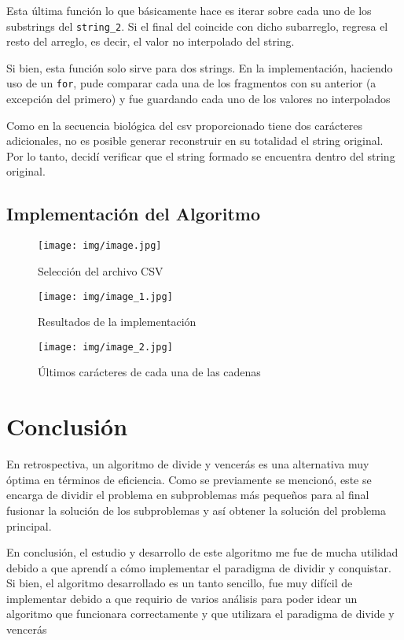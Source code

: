 \documentclass[12pt, a4paper]{article} %
\begin{document}
Esta última función lo que básicamente hace es iterar sobre cada uno de los substrings del \texttt{string\_2}. Si el final del  coincide con dicho subarreglo, regresa el resto del arreglo, es decir, el valor no interpolado del string.

Si bien, esta función solo sirve para dos strings. En la implementación, haciendo uso de un \texttt{for}, pude comparar cada una de los fragmentos con su anterior (a excepción del primero) y fue guardando cada uno de los valores no interpolados

\begin{tcolorbox}[colback=yellow!10!white,colframe=red!75!black,title=Importante]
	Como en la secuencia biológica del csv proporcionado tiene dos carácteres adicionales, no es posible generar reconstruir en su totalidad el string original. Por lo tanto, decidí verificar que el string formado se encuentra dentro del string original. 
\end{tcolorbox}

\subsection{Implementación del Algoritmo}

\begin{figure}[h]
	\centering
	\texttt{[image: img/image.jpg]}
	\caption{Selección del archivo CSV}
\end{figure}

\begin{figure}[h]
	\centering
	\texttt{[image: img/image\_1.jpg]}
	\caption{Resultados de la implementación}
\end{figure}

\begin{figure}[h]
	\centering
	\texttt{[image: img/image\_2.jpg]}
	\caption{Últimos carácteres de cada una de las cadenas}
\end{figure}

\clearpage
\section{Conclusión}

En retrospectiva, un algoritmo de divide y vencerás es una alternativa muy óptima en términos de eficiencia. Como se previamente se mencionó, este se encarga de dividir el problema en subproblemas más pequeños para al final fusionar la solución de los subproblemas y así obtener la solución del problema principal.

En conclusión, el estudio y desarrollo de este algoritmo me fue de mucha utilidad debido a que aprendí a cómo implementar el paradigma de dividir y conquistar. Si bien, el algoritmo desarrollado es un tanto sencillo, fue muy difícil de implementar debido a que requirio de varios análisis para poder idear un algoritmo que funcionara correctamente y que utilizara el paradigma de divide y vencerás

\nocite{*} %

\clearpage


\end{document}
